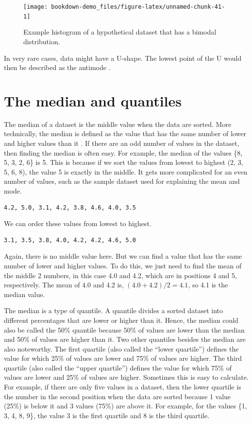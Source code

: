 \documentclass[
]{scrbook}
\begin{document}
\begin{figure}
\texttt{[image: bookdown-demo\_files/figure-latex/unnamed-chunk-41-1]} \caption{Example histogram of a hypothetical dataset that has a bimodal distribution.}\label{fig:unnamed-chunk-41}
\end{figure}

In very rare cases, data might have a U-shape.
The lowest point of the U would then be described as the antimode \citep{Sokal1995}.

\hypertarget{the-median-and-quantiles}{%
\section{The median and quantiles}\label{the-median-and-quantiles}}

The median of a dataset is the middle value when the data are sorted.
More technically, the median is defined as the value that has the same number of lower and higher values than it \citep{Sokal1995}.
If there are an odd number of values in the dataset, then finding the median is often easy.
For example, the median of the values \{8, 5, 3, 2, 6\} is 5.
This is because if we sort the values from lowest to highest (2, 3, 5, 6, 8), the value 5 is exactly in the middle.
It gets more complicated for an even number of values, such as the sample dataset used for explaining the mean and mode.

\begin{verbatim}
4.2, 5.0, 3.1, 4.2, 3.8, 4.6, 4.0, 3.5
\end{verbatim}

We can order these values from lowest to highest.

\begin{verbatim}
3.1, 3.5, 3.8, 4.0, 4.2, 4.2, 4.6, 5.0
\end{verbatim}

Again, there is no middle value here.
But we can find a value that has the same number of lower and higher values.
To do this, we just need to find the mean of the middle 2 numbers, in this case 4.0 and 4.2, which are in positions 4 and 5, respectively.
The mean of 4.0 and 4.2 is, \((4.0 + 4.2)/2 = 4.1\), so 4.1 is the median value.

The median is a type of quantile.
A quantile divides a sorted dataset into different percentages that are lower or higher than it.
Hence, the median could also be called the 50\% quantile because 50\% of values are lower than the median and 50\% of values are higher than it.
Two other quantiles besides the median are also noteworthy.
The first quartile (also called the ``lower quartile'') defines the value for which 25\% of values are lower and 75\% of values are higher.
The third quartile (also called the ``upper quartile'') defines the value for which 75\% of values are lower and 25\% of values are higher.
Sometimes this is easy to calculate.
For example, if there are only five values in a dataset, then the lower quartile is the number in the second position when the data are sorted because 1 value (25\%) is below it and 3 values (75\%) are above it.
For example, for the values \{1, 3, 4, 8, 9\}, the value 3 is the first quartile and 8 is the third quartile.
\end{document}
